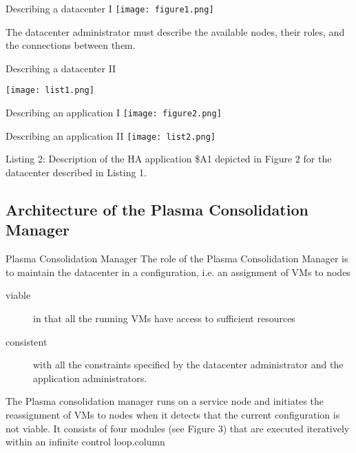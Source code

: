 
\begin{frame}{Describing a datacenter I }
\texttt{[image: figure1.png]} 

\pause{}

The datacenter administrator must describe the
available nodes, their roles, and the connections between them.

\end{frame}

\begin{frame}{Describing a datacenter II}

\texttt{[image: list1.png]} 

\end{frame}

\begin{frame}{Describing an application I}
\texttt{[image: figure2.png]} 
\end{frame}

\begin{frame}{Describing an application II}
\texttt{[image: list2.png]} 

Listing 2: Description of the HA application \$A1 depicted in Figure 2 for the
datacenter described in Listing 1.

\end{frame}

\subsection{Architecture of the Plasma Consolidation Manager} 
\begin{frame}{Plasma Consolidation Manager}
The role of the Plasma Consolidation Manager is to maintain the datacenter in
a configuration, i.e. an assignment of VMs to nodes
\pause{}
\begin{description}
\item[viable] in that all the running VMs have access to sufficient resources
\pause{}
\item[consistent] with all the constraints specified by the datacenter 
administrator and the application administrators. 
\pause{}
\end{description}
\pause{}
The Plasma consolidation manager runs on a service node and
initiates the reassignment of VMs to nodes when it detects that the current
configuration is not viable. It consists of four modules (see Figure 3) that are
executed iteratively within an infinite control loop.column
\end{frame}

